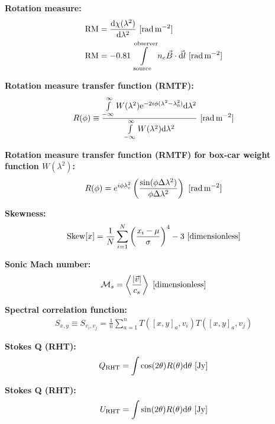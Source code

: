 \documentclass[a4paper,10pt]{article}
\begin{document}
{\noindent}\textbf{Rotation measure:}
\begin{align*}
{\rm RM} &= \dfrac{\mathrm{d}\chi(\lambda^2)}{\mathrm{d}\lambda^2} ~ [{\rm rad\,m^{-2}}] \\
\mathrm{RM}& = -0.81 \int\limits_\mathrm{source}^\mathrm{observer} n_e \vec{B}\cdot\vec{{\rm d}l} ~ [{\rm rad\,m^{-2}}]
\end{align*}

{\noindent}\textbf{Rotation measure transfer function (RMTF):}
\begin{align*}
R(\phi) \equiv \dfrac{\int\limits_{-\infty}^\infty W(\lambda^2)\mathrm{e}^{-2i\phi(\lambda^2-\lambda_0^2)}\mathrm{d}\lambda^2}{\int\limits_{-\infty}^\infty W(\lambda^2)\mathrm{d}\lambda^2} ~ [{\rm rad\,m^{-2}}]
\end{align*}

{\noindent}\textbf{Rotation measure transfer function (RMTF) for box-car weight function $W(\lambda^2)$:}
\begin{align*}
    R(\phi) = e^{i\phi\lambda_c^2}\left(\dfrac{\sin(\phi\Delta\lambda^2)}{\phi\Delta\lambda^2}\right) ~ [{\rm rad\,m^{-2}}]
\end{align*}

{\noindent}\textbf{Skewness:}
\begin{align*}
    {\rm Skew}[x] = \frac{1}{N} \sum_{i=1}^N \left(\frac{x_i-\mu}{\sigma}\right)^4 -3 ~ [{\rm dimensionless}]
\end{align*}

{\noindent}\textbf{Sonic Mach number:}
\begin{align*}
    \mathcal{M}_s = \left\langle\frac{\lvert\vec{v}\rvert}{c_s}\right\rangle ~ [{\rm dimensionless}]
\end{align*}

{\noindent}\textbf{Spectral correlation function:}
\begin{align*}
    S_{x,y} \equiv S_{v_i,v_j} = \frac{1}{n}\sum_{a=1}^n T([x,y]_a,v_i)T([x,y]_a,v_j)
\end{align*}

{\noindent}\textbf{Stokes Q (RHT):}
\begin{align*}
    Q_\mathrm{RHT} = \int\cos(2\theta)R(\theta)\mathrm{d}\theta ~ [{\rm Jy}]
\end{align*}

{\noindent}\textbf{Stokes Q (RHT):}
\begin{align*}
    U_\mathrm{RHT} = \int\sin(2\theta)R(\theta)\mathrm{d}\theta ~ [{\rm Jy}]
\end{align*}
\end{document}
